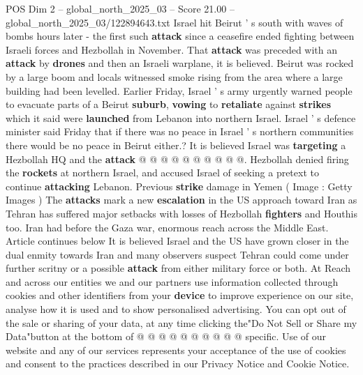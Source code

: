 \begin{textsample}{POS Dim 2 – global\_north\_2025\_03 – Score 21.00 – global\_north\_2025\_03/122894643.txt}
Israel hit Beirut ' s south with waves of bombs hours later - the first such \textbf{attack} since a ceasefire ended fighting between Israeli forces and Hezbollah in November.
That \textbf{attack} was preceded with an \textbf{attack} by \textbf{drones} and then an Israeli warplane, it is believed.
Beirut was rocked by a large boom and locals witnessed smoke rising from the area where a large building had been levelled.
Earlier Friday, Israel ' s army urgently warned people to evacuate parts of a Beirut \textbf{suburb}, \textbf{vowing} to \textbf{retaliate} against \textbf{strikes} which it said were \textbf{launched} from Lebanon into northern Israel.
Israel ' s defence minister said Friday that if there was no peace in Israel ' s northern communities there would be no peace in Beirut either.?
It is believed Israel was \textbf{targeting} a Hezbollah HQ and the \textbf{attack} @ @ @ @ @ @ @ @ @ @.
Hezbollah denied firing the \textbf{rockets} at northern Israel, and accused Israel of seeking a pretext to continue \textbf{attacking} Lebanon.
Previous \textbf{strike} damage in Yemen ( Image : Getty Images ) The \textbf{attacks} mark a new \textbf{escalation} in the US approach toward Iran as Tehran has suffered major setbacks with losses of Hezbollah \textbf{fighters} and Houthis too.
Iran had before the Gaza war, enormous reach across the Middle East.
Article continues below It is believed Israel and the US have grown closer in the dual enmity towards Iran and many observers suspect Tehran could come under further scritny or a possible \textbf{attack} from either military force or both.
At Reach and across our entities we and our partners use information collected through cookies and other identifiers from your \textbf{device} to improve experience on our site, analyse how it is used and to show personalised advertising.
You can opt out of the sale or sharing of your data, at any time clicking the"Do Not Sell or Share my Data"button at the bottom of @ @ @ @ @ @ @ @ @ @ specific.
Use of our website and any of our services represents your acceptance of the use of cookies and consent to the practices described in our Privacy Notice and Cookie Notice.

\end{textsample}

